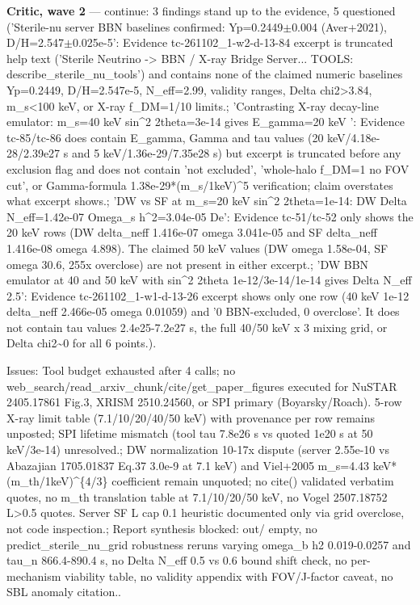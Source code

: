 \documentclass[11pt,a4paper]{article}
\begin{document}
\textbf{Critic, wave 2} --- continue: 3 findings stand up to the evidence, 5 questioned ('Sterile-nu server BBN baselines confirmed: Yp=0.2449$\pm$0.004 (Aver+2021), D/H=2.547$\pm$0.025e-5': Evidence tc-261102\_1-w2-d-13-84 excerpt is truncated help text ('Sterile Neutrino -\textgreater{} BBN / X-ray Bridge Server... TOOLS: describe\_sterile\_nu\_tools') and contains none of the claimed numeric baselines Yp=0.2449, D/H=2.547e-5, N\_eff=2.99, validity ranges, Delta chi2\textgreater{}3.84, m\_s\textless{}100 keV, or X-ray f\_DM=1/10 limits.; 'Contrasting X-ray decay-line emulator: m\_s=40 keV sin\textasciicircum{}2 2theta=3e-14 gives E\_gamma=20 keV ': Evidence tc-85/tc-86 does contain E\_gamma, Gamma and tau values (20 keV/4.18e-28/2.39e27 s and 5 keV/1.36e-29/7.35e28 s) but excerpt is truncated before any exclusion flag and does not contain 'not excluded', 'whole-halo f\_DM=1 no FOV cut', or Gamma-formula 1.38e-29*(m\_s/1keV)\textasciicircum{}5 verification; claim overstates what excerpt shows.; 'DW vs SF at m\_s=20 keV sin\textasciicircum{}2 2theta=1e-14: DW Delta N\_eff=1.42e-07 Omega\_s h\textasciicircum{}2=3.04e-05 De': Evidence tc-51/tc-52 only shows the 20 keV rows (DW delta\_neff 1.416e-07 omega 3.041e-05 and SF delta\_neff 1.416e-08 omega 4.898). The claimed 50 keV values (DW omega 1.58e-04, SF omega 30.6, 255x overclose) are not present in either excerpt.; 'DW BBN emulator at 40 and 50 keV with sin\textasciicircum{}2 2theta 1e-12/3e-14/1e-14 gives Delta N\_eff 2.5': Evidence tc-261102\_1-w1-d-13-26 excerpt shows only one row (40 keV 1e-12 delta\_neff 2.466e-05 omega 0.01059) and '0 BBN-excluded, 0 overclose'. It does not contain tau values 2.4e25-7.2e27 s, the full 40/50 keV x 3 mixing grid, or Delta chi2\textasciitilde{}0 for all 6 points.).

Issues: Tool budget exhausted after 4 calls; no web\_search/read\_arxiv\_chunk/cite/get\_paper\_figures executed for NuSTAR 2405.17861 Fig.3, XRISM 2510.24560, or SPI primary (Boyarsky/Roach). 5-row X-ray limit table (7.1/10/20/40/50 keV) with provenance per row remains unposted; SPI lifetime mismatch (tool tau 7.8e26 s vs quoted 1e20 s at 50 keV/3e-14) unresolved.; DW normalization 10-17x dispute (server 2.55e-10 vs Abazajian 1705.01837 Eq.37 3.0e-9 at 7.1 keV) and Viel+2005 m\_s=4.43 keV*(m\_th/1keV)\textasciicircum{}\{4/3\} coefficient remain unquoted; no cite() validated verbatim quotes, no m\_th translation table at 7.1/10/20/50 keV, no Vogel 2507.18752 L\textgreater{}0.5 quotes. Server SF L cap 0.1 heuristic documented only via grid overclose, not code inspection.; Report synthesis blocked: out/ empty, no predict\_sterile\_nu\_grid robustness reruns varying omega\_b h2 0.019-0.0257 and tau\_n 866.4-890.4 s, no Delta N\_eff 0.5 vs 0.6 bound shift check, no per-mechanism viability table, no validity appendix with FOV/J-factor caveat, no SBL anomaly citation..
\end{document}
